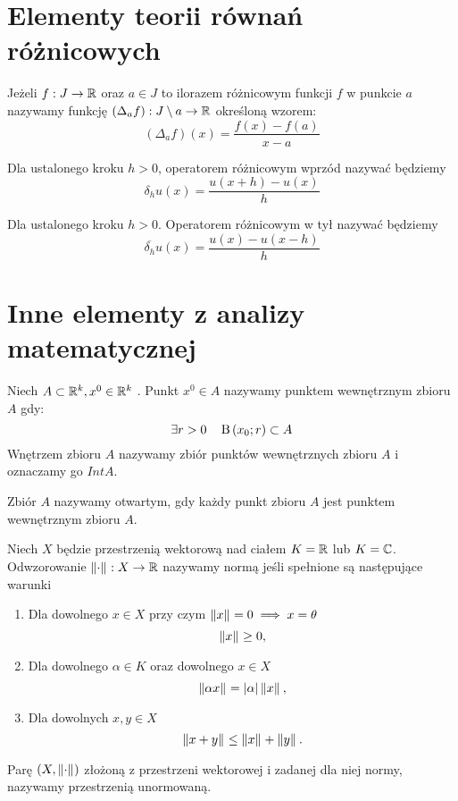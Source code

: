 \documentclass[12pt,a4paper]{report}
\begin{document}
\section{Elementy teorii równań różnicowych}
 
\begin{definition}
Jeżeli $ f: J \to \mathbb{R} $ oraz $ a \in J$ to ilorazem różnicowym funkcji $f$ w punkcie $a$ nazywamy funkcję $ (\Delta_{a}f) : J \setminus a \to \mathbb{R} $ określoną wzorem: 
$$
(\Delta_{a}f)(x) = \frac{f(x) - f(a)}{x-a}
$$
\end{definition}
\begin{definition}
Dla ustalonego kroku $h>0 $, operatorem różnicowym wprzód nazywać będziemy 
$$
\delta_h u(x) = \frac{u(x+h) - u(x)}{h}
$$
\end{definition}

\begin{definition}
Dla ustalonego kroku $h>0$. Operatorem różnicowym w tył nazywać będziemy 
$$
\overline{\delta_h} u(x) = \frac{u(x)-u(x-h)}{h} 
$$
\end{definition}


\section{Inne elementy z analizy matematycznej}

\begin{definition} 
Niech $A \subset \mathbb{R}^k, x^0 \in \mathbb{R}^k$ . Punkt $x^0 \in A$ nazywamy punktem wewnętrznym zbioru $A$ gdy:
$$
\exists  r>0 \quad   \ball{x_0}{r} \subset A
$$
Wnętrzem zbioru $A$ nazywamy zbiór punktów wewnętrznych zbioru $A$ i oznaczamy go $IntA$.
\end{definition}

\begin{definition}  
Zbiór $A$ nazywamy otwartym, gdy każdy punkt zbioru $A$ jest punktem wewnętrznym zbioru $A$. 
\end{definition}

\begin{definition} [Norma]
Niech $X$ będzie przestrzenią wektorową nad ciałem $K =\mathbb{R} $ lub $ K = \mathbb{C} $. Odwzorowanie $\left\| {\cdot} \right\|_{}: X \to \mathbb{R}$ nazywamy normą jeśli spełnione są następujące warunki 
\begin{enumerate}
\item Dla dowolnego $x\in X$ przy czym  $  \left\| {x} \right\|_{} = 0 \implies x = \theta$
$$
\left\| {x} \right\|_{} \geq 0 ,
$$
\item Dla dowolnego $\alpha \in K$ oraz dowolnego $x \in X$ 
$$
\left\| {\alpha x} \right\|_{}  = {\left| {\alpha} \right|}  \left\| {x} \right\|_{},
$$
\item Dla dowolnych $x,y\in X$
$$
 \left\| {x+y} \right\|_{} \leq \left\| {x} \right\|_{} + \left\| {y} \right\|_{}.
$$
\end{enumerate}
Parę $ (X, \left\| {\cdot} \right\|_{})$ złożoną z przestrzeni wektorowej i zadanej dla niej normy, nazywamy przestrzenią unormowaną. 
\end{definition}
\end{document}
